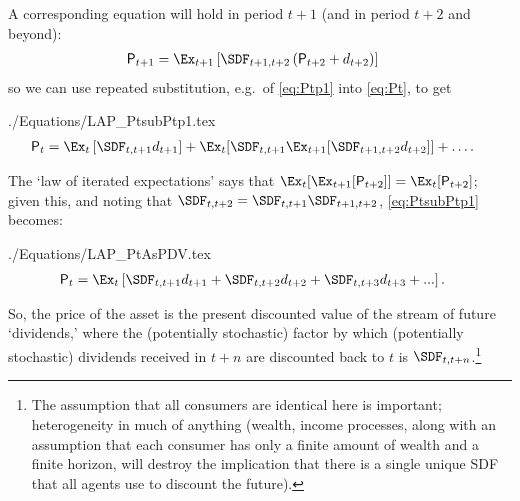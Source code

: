 \documentclass{\handout}
\begin{document}
A corresponding equation will hold in period $t+1$ (and in period $t+2$ and beyond):
\begin{equation}\begin{gathered}\begin{aligned}
 \Price_{t+1} & =  \Ex_{t+1}\left[\SDF_{t+1,t+2}\left({\Price}_{t+2}+\dvdnd_{t+2}\right)\right] \label{eq:Ptp1}
\end{aligned}\end{gathered}\end{equation}
so we can use repeated substitution, e.g.\ of \eqref{eq:Ptp1} into \eqref{eq:Pt}, to get
\begin{verbatimwrite}{./Equations/LAP_PtsubPtp1.tex}
\begin{equation}\begin{gathered}\begin{aligned}
 \Price_{t} & =  \Ex_{t}\left[\SDF_{t,t+1}\dvdnd_{t+1}\right]+\Ex_{t}[\SDF_{t,t+1}\Ex_{t+1}[\SDF_{t+1,t+2}\dvdnd_{t+2}]]+ \ldots \label{eq:PtsubPtp1}
.
\end{aligned}\end{gathered}\end{equation}
\end{verbatimwrite}


The `law of iterated expectations' says that
$\Ex_{t}[\Ex_{t+1}[{\Price}_{t+2}]] = \Ex_{t}[{\Price}_{t+2}]$;
given this, and noting that $\SDF_{t,t+2} = \SDF_{t,t+1}\SDF_{t+1,t+2}$, \eqref{eq:PtsubPtp1} becomes:
\begin{verbatimwrite}{./Equations/LAP_PtAsPDV.tex}
\begin{equation}\begin{gathered}\begin{aligned}
 \Price_{t} & =  \Ex_{t}\left[\SDF_{t,t+1}\dvdnd_{t+1}+\SDF_{t,t+2}\dvdnd_{t+2}+\SDF_{t,t+3}\dvdnd_{t+3}+...\right] . \label{eq:PtAsPDV}
\end{aligned}\end{gathered}\end{equation}
\end{verbatimwrite}

So, the price of the asset is the present discounted value of the stream of future `dividends,' where the (potentially stochastic) factor by which (potentially stochastic) dividends received in $t+n$ are discounted back to $t$ is $\SDF_{t,t+n}$.\footnote{The assumption that all consumers are identical here is important; heterogeneity in much of anything (wealth, income processes, along with an assumption that each consumer has only a finite amount of wealth and a finite horizon, will destroy the implication that there is a single unique SDF that all agents use to discount the future).}
\end{document}
